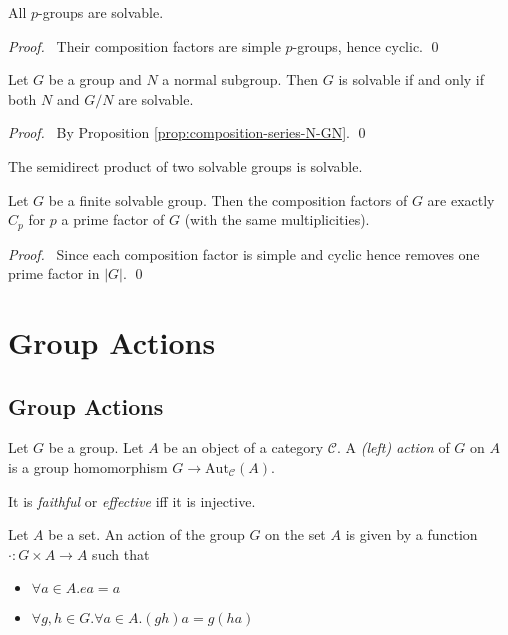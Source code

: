 \begin{cor}
All $p$-groups are solvable.
\end{cor}

\begin{proof}
\pf\ Their composition factors are simple $p$-groups, hence cyclic. \qed
\end{proof}

\begin{cor}
Let $G$ be a group and $N$ a normal subgroup. Then $G$ is solvable if and only if both $N$ and $G/N$ are solvable.
\end{cor}

\begin{proof}
\pf\ By Proposition \ref{prop:composition-series-N-GN}. \qed
\end{proof}

\begin{cor}
The semidirect product of two solvable groups is solvable.
\end{cor}

\begin{cor}
Let $G$ be a finite solvable group. Then the composition factors of $G$ are exactly $C_p$ for $p$ a prime factor of $G$ (with the same multiplicities).
\end{cor}

\begin{proof}
\pf\ Since each composition factor is simple and cyclic hence removes one prime factor in $|G|$. \qed
\end{proof}

\chapter{Group Actions}

\section{Group Actions}

\begin{df}[Action]
Let $G$ be a group. Let $A$ be an object of a category $\mathcal{C}$. A \emph{(left) action} of $G$ on $A$ is a group homomorphism $G \rightarrow \mathrm{Aut}_\mathcal{C}(A)$.

It is \emph{faithful} or \emph{effective} iff it is injective.
\end{df}

\begin{prop}
Let $A$ be a set. An action of the group $G$ on the set $A$ is given by a function $\cdot : G \times A \rightarrow A$ such that
\begin{itemize}
\item $\forall a \in A. ea = a$
\item $\forall g,h \in G. \forall a \in A. (gh)a = g(ha)$
\end{itemize}
\end{prop}

